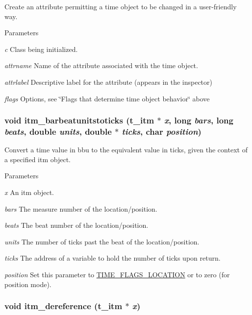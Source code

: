 Create an attribute permitting a time object to be changed in a user-\/friendly way. 
\begin{DoxyParams}{Parameters}
\item[{\em c}]Class being initialized. \item[{\em attrname}]Name of the attribute associated with the time object. \item[{\em attrlabel}]Descriptive label for the attribute (appears in the inspector) \item[{\em flags}]Options, see \char`\"{}Flags that determine time object behavior\char`\"{} above \end{DoxyParams}
\hypertarget{group__time_gadca2e82e0cadd3bacd75aa6a137ac530}{
\subsubsection[{itm\_\-barbeatunitstoticks}]{\setlength{\rightskip}{0pt plus 5cm}void itm\_\-barbeatunitstoticks ({\bf t\_\-itm} $\ast$ {\em x}, \/  long {\em bars}, \/  long {\em beats}, \/  double {\em units}, \/  double $\ast$ {\em ticks}, \/  char {\em position})}}
\label{group__time_gadca2e82e0cadd3bacd75aa6a137ac530}


Convert a time value in bbu to the equivalent value in ticks, given the context of a specified itm object. 
\begin{DoxyParams}{Parameters}
\item[{\em x}]An itm object. \item[{\em bars}]The measure number of the location/position. \item[{\em beats}]The beat number of the location/position. \item[{\em units}]The number of ticks past the beat of the location/position. \item[{\em ticks}]The address of a variable to hold the number of ticks upon return. \item[{\em position}]Set this parameter to \hyperlink{group__time_gga99fb83031ce9923c84392b4e92f956b5ac80606ccbb9a16c14cf81874e4de2408}{TIME\_\-FLAGS\_\-LOCATION} or to zero (for position mode). \end{DoxyParams}
\hypertarget{group__time_gae6d838ad8a0834e650a7664a50b0b6e2}{
\subsubsection[{itm\_\-dereference}]{\setlength{\rightskip}{0pt plus 5cm}void itm\_\-dereference ({\bf t\_\-itm} $\ast$ {\em x})}}
\label{group__time_gae6d838ad8a0834e650a7664a50b0b6e2}


